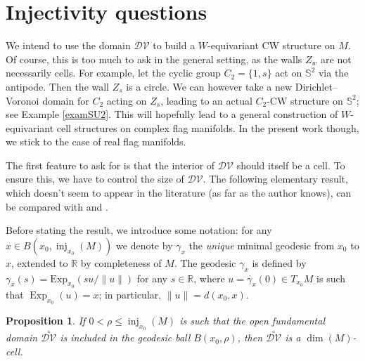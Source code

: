 \documentclass[11pt,twoside]{amsart}
\theoremstyle{plain}
\newtheorem{prop}{Proposition}[section]
\newcommand{\R}{{\mathbb R}}
\DeclareMathOperator{\Exp}{\mathrm{Exp}}
\newcommand{\Sph}{\mathbb{S}}
\DeclareMathOperator\inj{inj}
\begin{document}
\section{Injectivity questions}


We intend to use the domain $\mathcal{DV}$ to build a $W$-equivariant CW structure on $M$. Of course, this is too much to ask in the general setting, as the walls $Z_w$ are not necessarily cells. For example, let the cyclic group $C_2=\{1,s\}$ act on $\Sph^2$ via the antipode. Then the wall $Z_s$ is a circle. We can however take a new Dirichlet--Voronoi domain for $C_2$ acting on $Z_s$, leading to an actual $C_2$-CW structure on $\Sph^2$; see Example \ref{examSU2}. This will hopefully lead to a general construction of $W$-equivariant cell structures on complex flag manifolds. In the present work though, we stick to the case of real flag manifolds.

The first feature to ask for is that the interior of $\mathcal{DV}$ should itself be a cell. To ensure this, we have to control the size of $\mathcal{DV}$. The following elementary result, which doesn't seem to appear in the literature (as far as the author knows), can be compared with \cite[Lemma B.4]{boissonnat-dyer-ghosh_rep} and \cite[Theorem 1]{dyer-vegter-wintraecken}.

Before stating the result, we introduce some notation: for any $x\in B(x_0,\inj_{x_0}(M))$ we denote by $\gamma_x$ the \emph{unique} minimal geodesic from $x_0$ to $x$, extended to $\R$ by completeness of $M$. The geodesic $\gamma_x$ is defined by $\gamma_x(s)=\mathrm{Exp}_{x_0}\!\left({su}/{\|u\|}\right)$ for any $s\in\R$, where $u=\dot{\gamma_x}(0)\in T_{x_0}M$ is such that $\Exp_{x_0}(u)=x$; in particular, $\|u\|=d(x_0,x)$.

\begin{prop}\label{intDVcell}
If $0<\rho\le\inj_{x_0}(M)$ is such that the open fundamental domain $\stackrel{\circ}{\mathcal{DV}}$ is included in the geodesic ball $B(x_0,\rho)$, then $\stackrel{\circ}{\mathcal{DV}}$ is a $\dim(M)$-cell.
\end{prop}
\end{document}
